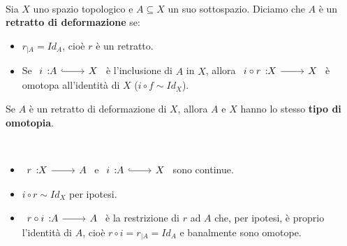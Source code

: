 \begin{define}~{}\\
	Sia $X$ uno spazio topologico e $A\subseteq X$ un suo sottospazio. Diciamo che $A$ è un \textbf{retratto di deformazione} se:
		\begin{itemize}
			\item $r_{\mid A}=Id_A$, cioè $r$ è un retratto.
			\item Se $\incl{i}{A}{X}$ è l'inclusione di $A$ in $X$, allora $\funz{i\circ r}{X}{X}$ è omotopa all'identità di $X$ ($i\circ f\sim Id_X$).
		\end{itemize}
	\vspace{-3mm}
\end{define}
\begin{observe}
	Se $A$ è un retratto di deformazione di $X$, allora $A$ e $X$ hanno lo stesso \textbf{tipo di omotopia}.
\end{observe}
\begin{demonstration}~{}
	\begin{itemize}
		\item $\funz{r}{X}{A}$ e $\incl{i}{A}{X}$ sono continue.
		\item $i\circ r\sim Id_X$ per ipotesi.
		\item $\funz{r\circ i}{A}{A}$ è la restrizione di $r$ ad $A$ che, per ipotesi, è proprio l'identità di $A$, cioè $r\circ i=r_{\mid A}=Id_A$ e banalmente sono omotope.
	\end{itemize}
\vspace{-3mm}
\end{demonstration}

